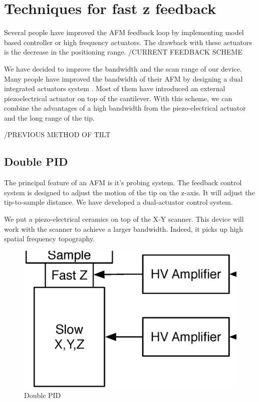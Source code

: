 \chapter{Techniques for fast z feedback}

Several people have improved the AFM feedback loop by implementing model based controller or high frequency actuators. The drawback with these actuators is the decrease in the positioning range.
/CURRENT FEEDBACK SCHEME

We have decided to improve the bandwidth and the scan range of our device. 
Many people have improved the bandwidth of their AFM by designing a dual integrated actuators system \cite{sulchek1999dual}. Most of them have introduced an external piezoelectrical actuator on top of the cantilever. With this scheme, we can combine the advantages of a high bandwidth from the piezo-electrical actuator and the long range of the tip.

/PREVIOUS METHOD OF TILT




\section{Double PID}

The principal feature of an AFM is it's probing system. \cite{jeong:093706} The feedback control system is designed to adjust the motion of the tip on the z-axis. It will adjust the tip-to-sample distance. We have developed a dual-actuator control system. 

We put a piezo-electrical ceramics on top of the X-Y scanner. This device will work with the scanner to achieve a larger bandwidth. Indeed, it picks up high spatial frequency topography. 

\begin{figure}[H]
  \centering
  \includegraphics[scale=0.3]{images/doublePID.eps}
    \caption{Double PID}
  \label{DoublePid}
\end{figure}



